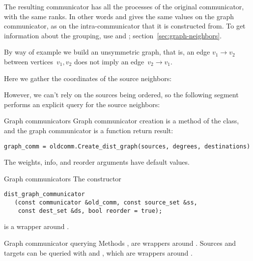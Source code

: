 The resulting communicator has all the processes of the original
communicator, with the same ranks.
In other words  and 
gives the same values on the graph communicator, as on the intra-communicator
that it is constructed from.
To get information about the grouping,
use 
and ;
section~\ref{sec:graph-neighbors}.

By way of example we build an unsymmetric graph, that is,
an edge $v_1\rightarrow v_2$ between vertices~$v_1,v_2$
does not imply an edge~$v_2\rightarrow v_1$.
%

Here we gather the coordinates of the source neighbors:

{
  \def\snippetcodefraction{.45}
  \def\snippetlistfraction{.5} 
}

However, we can't rely on the sources being ordered,
so the following segment performs an explicit query for the
source neighbors:

{
  \def\snippetcodefraction{.45}
  \def\snippetlistfraction{.5} 
}

\begin{pythonnote}{Graph communicators}
  Graph communicator creation is a method of the  class,
  and the graph communicator is a function return result:
\begin{lstlisting}
graph_comm = oldcomm.Create_dist_graph(sources, degrees, destinations)
\end{lstlisting}
  The weights, info, and reorder arguments have default values.
\end{pythonnote}

\begin{mplnote}{Graph communicators}
  \label{mpl:graph-comm}
  The constructor 
\begin{lstlisting}
dist_graph_communicator
   (const communicator &old_comm, const source_set &ss,
    const dest_set &ds, bool reorder = true);    
\end{lstlisting}
is a wrapper around .
\end{mplnote}
\begin{mplnote}{Graph communicator querying}
  \label{mpl:graph-query}
  Methods , 
  are wrappers around .
  Sources and targets can be queried with
   and ,
  which are wrappers around .
\end{mplnote}


